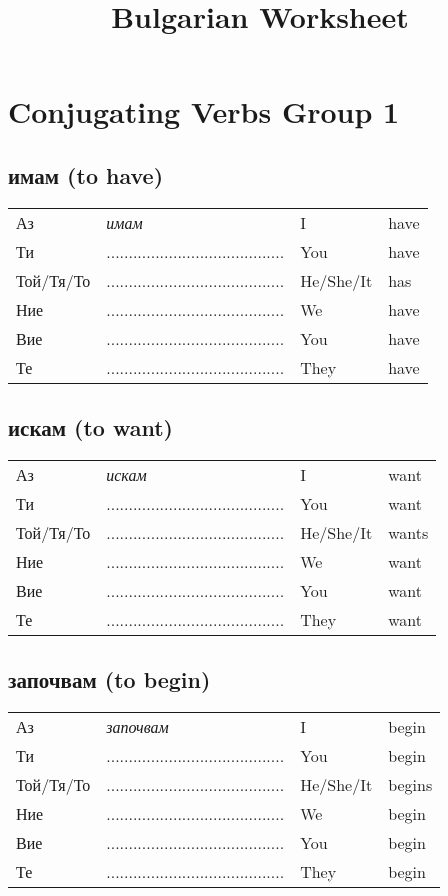 \documentclass[12pt,a4paper]{article}
\title{Bulgarian Worksheet}
\makeatletter
\newcommand{\blank}{........................................}
\newcommand{\conjugationtable}[7]{\begin{tabular}{ll@{\hspace{1cm}}ll}
    Аз & {\em #1} & I & #2 \\
    Ти & \blank & You & #3 \\
    Той/Тя/То & \blank & He/She/It & #4 \\
    Ние & \blank & We & #5 \\
    Вие & \blank & You & #6 \\
    Те & \blank & They & #7 \\
    \end{tabular}}
\makeatother
\begin{document}
\section*{Conjugating Verbs Group 1}
\subsection*{имам (to have)}
\conjugationtable{имам}{have}{have}{has}{have}{have}{have}

\subsection*{искам (to want)}
\conjugationtable{искам}{want}{want}{wants}{want}{want}{want}

\subsection*{започвам (to begin)}
\conjugationtable{започвам}{begin}{begin}{begins}{begin}{begin}{begin}
\end{document}
